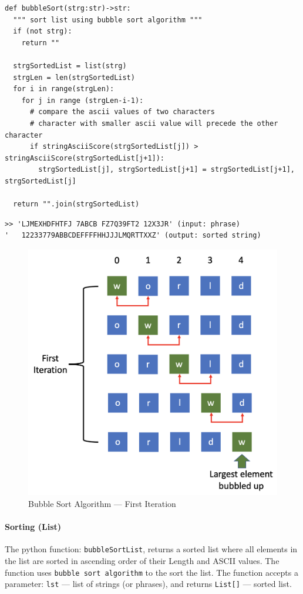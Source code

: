 \documentclass[UTF8, letter]{article}
\begin{document}
\begin{codeblock}
\begin{verbatim}
def bubbleSort(strg:str)->str:
  """ sort list using bubble sort algorithm """
  if (not strg):
    return ""

  strgSortedList = list(strg)
  strgLen = len(strgSortedList)  
  for i in range(strgLen):
    for j in range (strgLen-i-1):
      # compare the ascii values of two characters
      # character with smaller ascii value will precede the other character  
      if stringAsciiScore(strgSortedList[j]) > stringAsciiScore(strgSortedList[j+1]):
        strgSortedList[j], strgSortedList[j+1] = strgSortedList[j+1], strgSortedList[j]
        
  return "".join(strgSortedList) 
\end{verbatim}
\end{codeblock}

\vspace{5mm}
\begin{codeblock}[frametitle=Output --- Sorting:]
\begin{verbatim}
>> 'LJMEXHDFHTFJ 7ABCB FZ7Q39FT2 12X3JR' (input: phrase)
'   12233779ABBCDEFFFFHHJJJLMQRTTXXZ' (output: sorted string)
\end{verbatim}
\end{codeblock}

\vspace{5mm}
\begin{figure}[h!]
	\centering
	\includegraphics[width=0.5\linewidth]{bubble_sort.png}
	\caption{Bubble Sort Algorithm --- First Iteration}
	\label{fig:boat1}
\end{figure}


\pagebreak
\paragraph{Sorting (List)}
The python function: \texttt{bubbleSortList}, returns a sorted list where all elements in the list are sorted in ascending order of their Length and ASCII values. The function uses \texttt{bubble sort algorithm} to the sort the list. The function accepts a parameter: \texttt{lst} --- list of strings (or phrases), and returns \texttt{List[]} --- sorted list.
\end{document}

